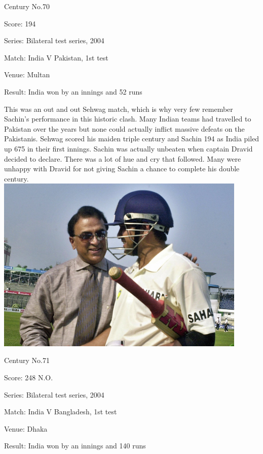 \documentclass[11pt, a4paper]{article}
\begin{document}
Century No.70 

Score: 194 

Series: Bilateral test series, 2004 

Match: India V Pakistan, 1st test 

Venue: Multan 

Result: India won by an innings and 52 runs 

This was an out and out Sehwag match, which is why very few remember Sachin's performance in this historic clash. Many Indian teams had travelled to Pakistan over the years but none could actually inflict massive defeats on the Pakistanis. Sehwag scored his maiden triple century and Sachin 194 as India piled up 675 in their first innings. Sachin was actually unbeaten when captain Dravid decided to declare. There was a lot of hue and cry that followed. Many were unhappy with Dravid for not giving Sachin a chance to complete his double century.
\newpage
\includegraphics[width=0.9\textwidth]{pics/71.jpg}

Century No.71 

Score: 248 N.O. 

Series: Bilateral test series, 2004 

Match: India V Bangladesh, 1st test 

Venue: Dhaka 

Result: India won by an innings and 140 runs 
\end{document}
